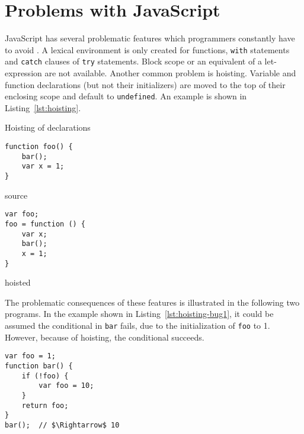 \documentclass{acm_proc_article-sp}
\makeatletter
\newenvironment{sublisting}[2][]{%
\def\sf@one{#1}%
\def\sf@two{#2}%
\setbox\sf@box\hbox
\bgroup
}{%
\egroup
\ifx\@empty\sf@two\@empty\relax
\def\sf@two{\@empty}
\fi
\ifx\@empty\sf@one\@empty\relax
\subfloat[\sf@two]{\box\sf@box}%
\else
\subfloat[\sf@one][\sf@two]{\box\sf@box}%
\fi
}
\makeatother
\begin{document}
\section{Problems with JavaScript}\label{sec:problems}

JavaScript has several problematic features which programmers
constantly have to avoid \cite{crockford2008}. A lexical environment is
only created for functions, \texttt{with} statements and
\texttt{catch} clauses of \texttt{try} statements. Block scope or an
equivalent of a let-expression are not available. Another common
problem is hoisting. Variable and function declarations (but not their
initializers) are moved to the top of their enclosing scope and
default to \texttt{undefined}. An example is shown in
Listing~\ref{lst:hoisting}.

\begin{mylisting}[h]
  \caption{Hoisting of declarations}
  \label{lst:hoisting}
  \vspace{-2em}
  \begin{sublisting}{source}
    \begin{minipage}[b]{.4\textwidth}
      \begin{lstlisting}
function foo() {
    bar();
    var x = 1;
}
      \end{lstlisting}
    \end{minipage}
  \end{sublisting}
  \hfill
  \begin{sublisting}{hoisted}
    \begin{minipage}[b]{.50\textwidth}
      \begin{lstlisting}
var foo;
foo = function () {
    var x;
    bar();
    x = 1;
}
      \end{lstlisting}
    \end{minipage}
  \end{sublisting}
\end{mylisting}
\vspace{-0.5em}

The problematic consequences of these features is illustrated in
the following two programs. In the example shown in
Listing~\ref{lst:hoisting-bug1}, it could be assumed the
conditional in \texttt{bar} fails, due to the initialization of
\texttt{foo} to 1. However, because of hoisting, the conditional
succeeds.

\begin{lstlisting}[caption=Bug caused by hoisting,label=lst:hoisting-bug1]
var foo = 1;
function bar() {
    if (!foo) {
        var foo = 10;
    }
    return foo;
}
bar();  // $\Rightarrow$ 10
\end{lstlisting}
\end{document}
